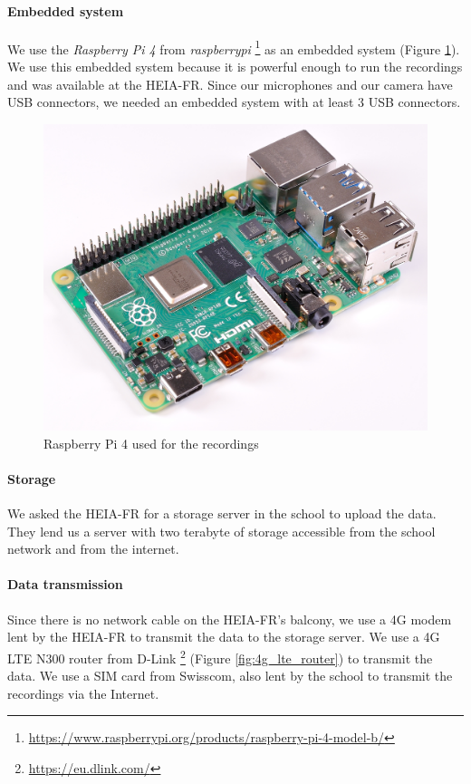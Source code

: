 \paragraph{Embedded system}
We use the \textit{Raspberry Pi 4} from \textit{raspberrypi} \footnote{\url{https://www.raspberrypi.org/products/raspberry-pi-4-model-b/}} as an embedded system (Figure \ref{fig:raspberry_pi_4}). We use this embedded system because it is powerful enough to run the recordings and was available at the HEIA-FR. Since our microphones and our camera have USB connectors, we needed an embedded system with at least 3 USB connectors.

\begin{figure}[H]
    \centering
    \includegraphics[width=.5\textwidth]{images/raspberry_pi_4.png}
    \caption{Raspberry Pi 4 used for the recordings}
    \label{fig:raspberry_pi_4}
\end{figure}

\paragraph{Storage}

We asked the HEIA-FR for a storage server in the school to upload the data. They lend us a server with two terabyte of storage accessible from the school network and from the internet.

\paragraph{Data transmission}

Since there is no network cable on the HEIA-FR's balcony, we use a 4G modem lent by the HEIA-FR to transmit the data to the storage server. We use a 4G LTE N300 router from D-Link \footnote{\url{https://eu.dlink.com/}} (Figure \ref{fig:4g_lte_router}) to transmit the data. We use a SIM card from Swisscom, also lent by the school to transmit the recordings via the Internet.

